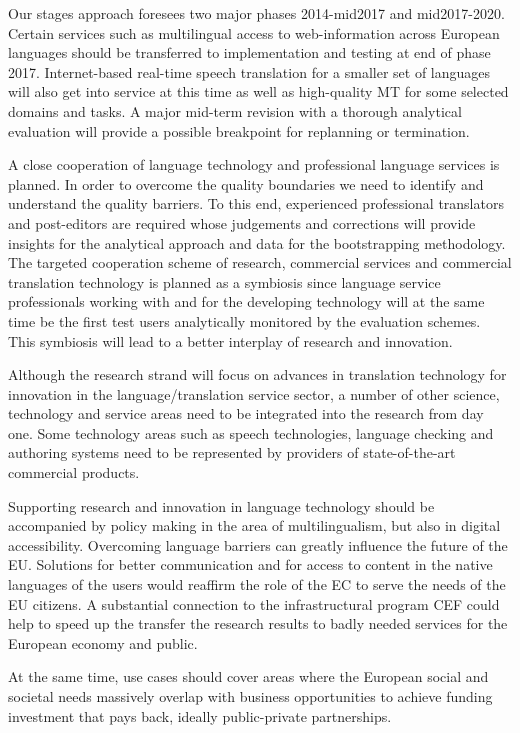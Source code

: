 \documentclass[10pt, plain]{../../metanetpaper}
\begin{document}
\begin{multicols}{2}
Our stages approach foresees two major phases 2014-mid2017 and mid2017-2020. Certain services such as multilingual access to web-information across European languages should be transferred to implementation and testing at end of phase 2017. Internet-based real-time speech translation for a smaller set of languages will also get into service at this time as well as high-quality MT for some selected domains and tasks. A major mid-term revision with a thorough analytical evaluation will provide a possible breakpoint for replanning or termination.
 
A close cooperation of language technology and professional language services is planned. In order to overcome the quality boundaries we need to identify and understand the quality barriers. To this end, experienced professional translators and post-editors are required whose judgements and corrections will provide insights for the analytical approach and data for the bootstrapping methodology. The targeted cooperation scheme of research, commercial services and commercial translation technology is planned as a symbiosis since language service professionals working with and for the developing technology will at the same time be the first test users analytically monitored by the evaluation schemes. This symbiosis will lead to a better interplay of research and innovation.
 
Although the research strand will focus on advances in translation technology for innovation in the language/translation service sector, a number of other science, technology and service areas need to be integrated into the research from day one. Some technology areas such as speech technologies, language checking and authoring systems need to be represented by providers of state-of-the-art commercial products.
 
Supporting research and innovation in language technology should be accompanied by policy making in the area of multilingualism, but also in digital accessibility. Overcoming language barriers can greatly influence the future of the EU. Solutions for better communication and for access to content in the native languages of the users would reaffirm the role of the EC to serve the needs of the EU citizens. A substantial connection to the infrastructural program CEF could help to speed up the transfer the research results to badly needed services for the European economy and public.
 
At the same time, use cases should cover areas where the European social and societal needs massively overlap with business opportunities to achieve funding investment that pays back, ideally public-private partnerships.
 

\end{multicols}
\end{document}
